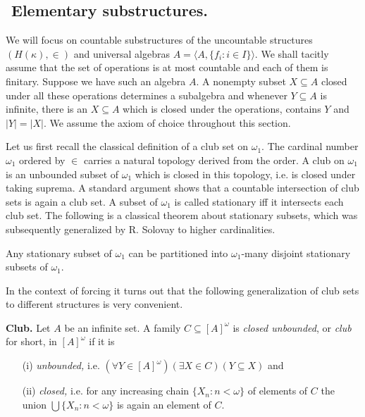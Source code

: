 \subsection{${}$ \hspace{-1em}Elementary substructures.}

We will focus on countable substructures of the uncountable structures
$(H(\kappa),\in)$ and universal algebras
$A=\langle A,\{f_i:i\in I\}\rangle$. We shall tacitly assume that the set of operations is at most
countable and each of them is finitary. Suppose we have such an algebra $A$.
A nonempty subset $X\subseteq A$ closed under all these operations determines a
subalgebra and whenever $Y\subseteq A$ is infinite, there is an $X\subseteq A$
which is closed under the operations,
contains $Y$ and $|Y|=|X|$. We assume the axiom of choice throughout this section.

\bigskip
Let us first recall the classical definition of a club set on $\omega_1$. The cardinal number
$\omega_1$ ordered by $\in$ carries a natural topology derived from the order. A club on $\omega_1$
is an unbounded subset of $\omega_1$ which is closed in this topology, i.e. is closed under
taking suprema. A standard argument shows that a countable intersection of club sets is again
a club set. A subset of $\omega_1$ is called stationary iff it intersects each club set. The following
is a classical theorem about stationary subsets, which was subsequently generalized by R. Solovay to
higher cardinalities.

\begin{theorem}[Fodor] Any stationary subset of $\omega_1$ can be partitioned into $\omega_1$-many
 disjoint stationary subsets of $\omega_1$.
\end{theorem}

In the context of forcing it turns out that the following generalization of club sets to
different structures is very convenient.

\begin{definition}\label{club}
{\bf Club.} Let $A$ be an infinite set. A family $C\subseteq[A]^{\omega}$ is
\emph{closed unbounded}, or \emph{club}
for short, in $[A]^\omega$ if it is
\begin{itemize}
  \item[(i)] \emph{unbounded,} i.e.
	$(\forall Y\in[A]^\omega)(\exists X\in C)(Y\subseteq X)$ and
  \item[(ii)] \emph{closed,} i.e. for any increasing chain $\{X_n:n<\omega\}$ of elements of
	$C$ the union $\bigcup\{X_n:n<\omega\}$ is again an element of $C$.
\end{itemize}
\end{definition}

